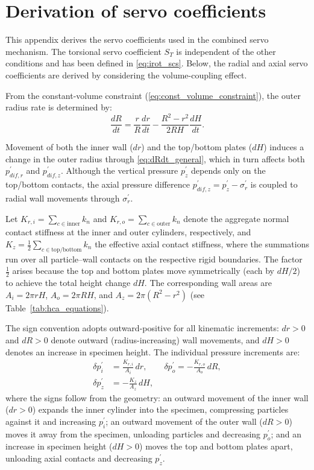 \section{Derivation of servo coefficients}
\label{sec:appendix_servo}

This appendix derives the servo coefficients used in the combined servo mechanism. The torsional servo coefficient $S_T$ is independent of the other conditions and has been defined in \cref{eq:irot_scs}. Below, the radial and axial servo coefficients are derived by considering the volume-coupling effect.

From the constant-volume constraint (\cref{eq:const_volume_constraint}), the outer radius rate is determined by:
\begin{equation}
\frac{dR}{dt} = \frac{r}{R}\frac{dr}{dt} - \frac{R^2-r^2}{2RH}\frac{dH}{dt}.
\label{eq:dRdt_general}
\end{equation}

Movement of both the inner wall ($dr$) and the top/bottom plates ($dH$) induces a change in the outer radius through \cref{eq:dRdt_general}, which in turn affects both $p_{dif,r}^{\prime}$ and $p_{dif,z}^{\prime}$. Although the vertical pressure $p_z^{\prime}$ depends only on the top/bottom contacts, the axial pressure difference $p_{dif,z}^{\prime}=p_z^{\prime}-\sigma_r^{\prime}$ is coupled to radial wall movements through $\sigma_r^{\prime}$.

Let $K_{r,i}=\sum_{c\in\mathrm{inner}} k_n$ and $K_{r,o}=\sum_{c\in\mathrm{outer}} k_n$ denote the aggregate normal contact stiffness at the inner and outer cylinders, respectively, and $K_z=\frac{1}{2}\sum_{c\in\mathrm{top/bottom}} k_n$ the effective axial contact stiffness, where the summations run over all particle--wall contacts on the respective rigid boundaries. The factor $\frac{1}{2}$ arises because the top and bottom plates move symmetrically (each by $dH/2$) to achieve the total height change $dH$. The corresponding wall areas are $A_i=2\pi rH$, $A_o=2\pi RH$, and $A_z=2\pi(R^2-r^2)$ (see Table~\ref{tab:hca_equations}).

The sign convention adopts outward-positive for all kinematic increments: $dr>0$ and $dR>0$ denote outward (radius-increasing) wall movements, and $dH>0$ denotes an increase in specimen height. The individual pressure increments are:
\begin{align}
\delta p_i^{\prime} &= \frac{K_{r,i}}{A_i}\,dr,\qquad
\delta p_o^{\prime} = -\frac{K_{r,o}}{A_o}\,dR, \label{eq:dp_individual_r}\\[4pt]
\delta p_z^{\prime} &= -\frac{K_z}{A_z}\,dH, \label{eq:dp_individual_z}
\end{align}
where the signs follow from the geometry: an outward movement of the inner wall ($dr>0$) expands the inner cylinder into the specimen, compressing particles against it and increasing $p_i^{\prime}$; an outward movement of the outer wall ($dR>0$) moves it away from the specimen, unloading particles and decreasing $p_o^{\prime}$; and an increase in specimen height ($dH>0$) moves the top and bottom plates apart, unloading axial contacts and decreasing $p_z^{\prime}$.

